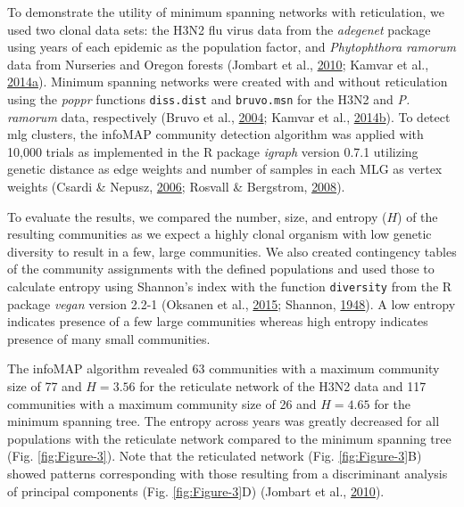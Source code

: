 \documentclass[double,11pt]{beavtex}
\begin{document}
  To demonstrate the utility of minimum spanning networks with
  reticulation, we used two clonal data sets: the H3N2 flu virus data from
  the \emph{adegenet} package using years of each epidemic as the
  population factor, and \emph{Phytophthora ramorum} data from Nurseries
  and Oregon forests (Jombart et al.,
  \protect\hyperlink{ref-jombart2010discriminant}{2010}; Kamvar et al.,
  \protect\hyperlink{ref-kamvar2014sudden}{2014}\protect\hyperlink{ref-kamvar2014sudden}{a}).
  Minimum spanning networks were created with and without reticulation
  using the \emph{poppr} functions \texttt{diss.dist} and
  \texttt{bruvo.msn} for the H3N2 and \emph{P. ramorum} data, respectively
  (Bruvo et al., \protect\hyperlink{ref-bruvo2004simple}{2004}; Kamvar et
  al.,
  \protect\hyperlink{ref-kamvar2014poppr}{2014}\protect\hyperlink{ref-kamvar2014poppr}{b}).
  To detect mlg clusters, the infoMAP community detection algorithm was
  applied with 10,000 trials as implemented in the R package \emph{igraph}
  version 0.7.1 utilizing genetic distance as edge weights and number of
  samples in each MLG as vertex weights (Csardi \& Nepusz,
  \protect\hyperlink{ref-csardi2006igraph}{2006}; Rosvall \& Bergstrom,
  \protect\hyperlink{ref-rosvall2008maps}{2008}).
  
  To evaluate the results, we compared the number, size, and entropy
  (\(H\)) of the resulting communities as we expect a highly clonal
  organism with low genetic diversity to result in a few, large
  communities. We also created contingency tables of the community
  assignments with the defined populations and used those to calculate
  entropy using Shannon's index with the function \texttt{diversity} from
  the R package \emph{vegan} version 2.2-1 (Oksanen et al.,
  \protect\hyperlink{ref-oksanen2015vegan}{2015}; Shannon,
  \protect\hyperlink{ref-shannon2001mathematical}{1948}). A low entropy
  indicates presence of a few large communities whereas high entropy
  indicates presence of many small communities.
  
  The infoMAP algorithm revealed 63 communities with a maximum community
  size of 77 and \(H = 3.56\) for the reticulate network of the H3N2 data
  and 117 communities with a maximum community size of 26 and \(H = 4.65\)
  for the minimum spanning tree. The entropy across years was greatly
  decreased for all populations with the reticulate network compared to
  the minimum spanning tree (Fig. \ref{fig:Figure-3}). Note that the
  reticulated network (Fig. \ref{fig:Figure-3}B) showed patterns
  corresponding with those resulting from a discriminant analysis of
  principal components (Fig. \ref{fig:Figure-3}D) (Jombart et al.,
  \protect\hyperlink{ref-jombart2010discriminant}{2010}).
  
\end{document}

